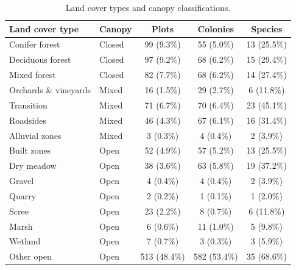 \documentclass[preprint,review,times,12pt,3p]{elsarticle}
\begin{document}
\begin{table}[ht]
	\centering
	\begin{tabular}{ l l c c c}
		\hline
		\textbf{Land cover type} & \textbf{Canopy} & \textbf{Plots} & \textbf{Colonies} & \textbf{Species} \\
		\hline
		Conifer forest & Closed & 99 (9.3\%) & 55 (5.0\%) & 13 (25.5\%) \\
		Deciduous forest & Closed & 97 (9.2\%) & 68 (6.2\%) & 15 (29.4\%) \\
		Mixed forest & Closed & 82 (7.7\%) & 68 (6.2\%) & 14 (27.4\%) \\
		Orchards \& vineyards & Mixed & 16 (1.5\%) & 29 (2.7\%) & 6 (11.8\%) \\
		Transition & Mixed & 71 (6.7\%) & 70 (6.4\%) & 23 (45.1\%) \\
		Roadsides & Mixed & 46 (4.3\%) & 67 (6.1\%) & 16 (31.4\%) \\
		Alluvial zones & Mixed & 3 (0.3\%) & 4 (0.4\%) & 2 (3.9\%) \\
		Built zones & Open & 52 (4.9\%) & 57 (5.2\%) & 13 (25.5\%) \\
		Dry meadow & Open & 38 (3.6\%) & 63 (5.8\%) & 19 (37.2\%) \\
		Gravel & Open & 4 (0.4\%) & 4 (0.4\%) & 2 (3.9\%) \\
		Quarry & Open & 2 (0.2\%) & 1 (0.1\%) & 1 (2.0\%) \\
		Scree & Open & 23 (2.2\%) & 8 (0.7\%) & 6 (11.8\%) \\
		Marsh & Open & 6 (0.6\%) & 11 (1.0\%) & 5 (9.8\%) \\
		Wetland & Open & 7 (0.7\%) & 3 (0.3\%) & 3 (5.9\%) \\
		Other open & Open & 513 (48.4\%) & 582 (53.4\%) & 35 (68.6\%) \\
	\end{tabular}
	\caption{\label{table:landcover} Land cover types and canopy classifications. }
\end{table}



\newpage
\end{document}
